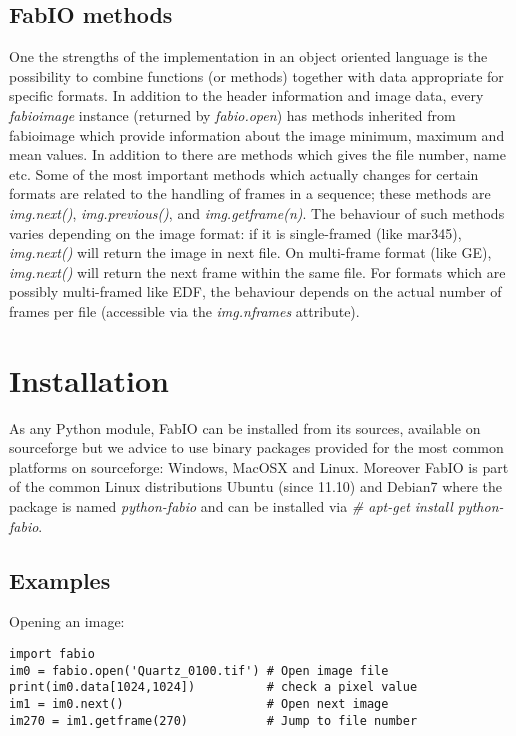 \documentclass[preprint ]{iucr}
\begin{document}
\subsection{FabIO methods}

One the strengths of the implementation in an object oriented language
is the possibility to combine functions (or methods) together with data
appropriate for specific formats.
In addition to the header information and image data, every {\em fabioimage}
instance (returned by {\em fabio.open}) has methods inherited from fabioimage 
which provide information about the image minimum, maximum and mean values.
In addition to there are methods which gives the file number, name etc. 
Some of the most important methods which actually changes for certain formats 
are related to the handling of frames in a sequence; these methods are {\em
img.next()}, {\em img.previous()}, and {\em img.getframe(n)}.
The behaviour of such methods varies depending on the
image format: if it is single-framed (like mar345),  {\em img.next()} will
return the image in next file. On multi-frame format (like GE), {\em img.next()}
will return the next frame within the same file. For formats which are possibly multi-framed like
EDF, the behaviour depends on the actual number of frames per file (accessible
via the {\em img.nframes} attribute).


\section{Installation}

As any Python module, FabIO can be installed from its sources, available on 
sourceforge \cite{fabio} but we advice to use binary packages provided for the
most common platforms on sourceforge: Windows, MacOSX and Linux.
Moreover FabIO is part of the common Linux distributions Ubuntu (since 11.10)
and Debian7 where the package is named {\em python-fabio} and can be installed
via {\em \# apt-get install python-fabio}. 

\subsection{Examples}

Opening an image:\\
\begin{verbatim}
import fabio     
im0 = fabio.open('Quartz_0100.tif') # Open image file
print(im0.data[1024,1024])          # check a pixel value
im1 = im0.next()                    # Open next image
im270 = im1.getframe(270)           # Jump to file number
\end{verbatim}
\end{document}
